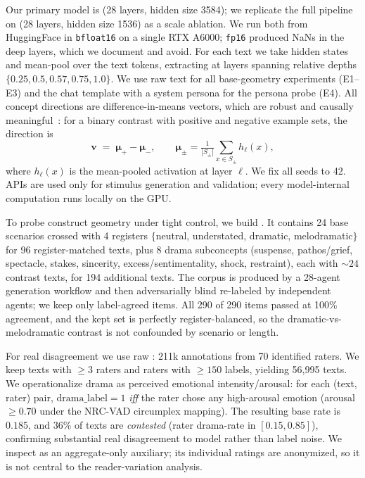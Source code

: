  Our primary model is \qwenbig (28 layers, hidden size 3584); we replicate the full pipeline on \qwensmall (28 layers, hidden size 1536) as a scale ablation. We run both from HuggingFace in \texttt{bfloat16} on a single RTX A6000; \texttt{fp16} produced NaNs in the deep layers, which we document and avoid. For each text we take hidden states and mean-pool over the text tokens, extracting at layers spanning relative depths $\{0.25, 0.5, 0.57, 0.75, 1.0\}$. We use raw text for all base-geometry experiments (E1--E3) and the chat template with a system persona for the persona probe (E4). All concept directions are difference-in-means vectors, which are robust and causally meaningful~\citep{marks2023geometry}: for a binary contrast with positive and negative example sets, the direction is
\[
\mathbf{v} \;=\; \boldsymbol{\mu}_{+} - \boldsymbol{\mu}_{-},
\qquad
\boldsymbol{\mu}_{\pm} = \tfrac{1}{|S_{\pm}|}\sum_{x \in S_{\pm}} h_\ell(x),
\]
where $h_\ell(x)$ is the mean-pooled activation at layer $\ell$. We fix all seeds to 42. APIs are used only for stimulus generation and validation; every model-internal computation runs locally on the GPU.

 To probe construct geometry under tight control, we build \dramacorpus. It contains 24 base scenarios crossed with 4 registers $\{$neutral, understated, dramatic, melodramatic$\}$ for 96 register-matched texts, plus 8 drama subconcepts (suspense, pathos/grief, spectacle, stakes, sincerity, excess/sentimentality, shock, restraint), each with ${\sim}24$ contrast texts, for 194 additional texts. The corpus is produced by a 28-agent generation workflow and then adversarially blind re-labeled by independent agents; we keep only label-agreed items. All 290 of 290 items passed at 100\% agreement, and the kept set is perfectly register-balanced, so the dramatic-vs-melodramatic contrast is not confounded by scenario or length.

 For real disagreement we use raw \goemotions: 211k annotations from 70 identified raters. We keep texts with $\geq 3$ raters and raters with $\geq 150$ labels, yielding 56,995 texts. We operationalize drama as perceived emotional intensity/arousal: for each (text, rater) pair, $\mathrm{drama\_label}=1$ \emph{iff} the rater chose any high-arousal emotion (arousal $\geq 0.70$ under the NRC-VAD circumplex mapping). The resulting base rate is $0.185$, and $36\%$ of texts are \emph{contested} (rater drama-rate in $[0.15, 0.85]$), confirming substantial real disagreement to model rather than label noise. We inspect \emobank as an aggregate-only auxiliary; its individual ratings are anonymized, so it is not central to the reader-variation analysis.

